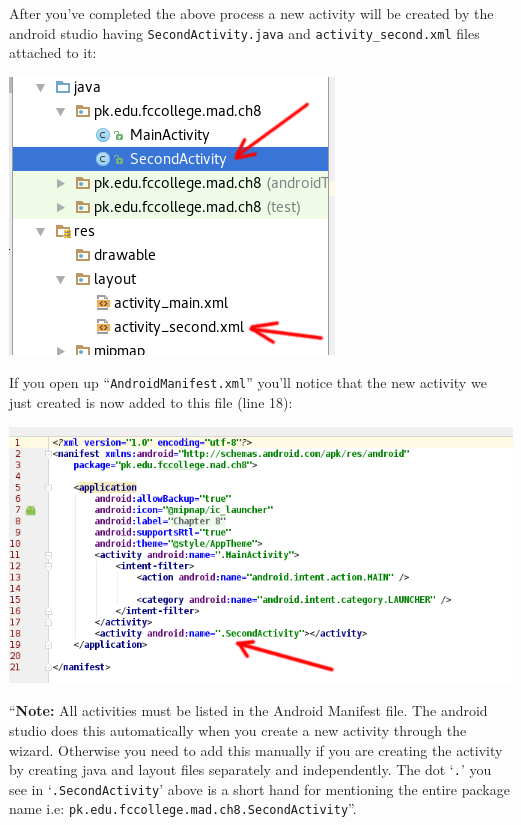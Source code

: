 After you've completed the above process a new activity will be created by the android studio having \texttt{SecondActivity.java} and \texttt{activity\_second.xml} files attached to it:

\begin{center}
	\includegraphics[scale=0.4]{chapters/ch08/images/4}
\end{center}

If you open up ``\texttt{AndroidManifest.xml}'' you'll notice that the new activity we just created is now added to this file (line 18):

\begin{center}
	\includegraphics[scale=0.4]{chapters/ch08/images/5}
\end{center}

``\textbf{Note:} All activities must be listed in the Android Manifest file. The android studio does this automatically when you create a new activity through the wizard. Otherwise you need to add this manually if you are creating the activity by creating java and layout files separately and independently. The dot `\texttt{.}' you see in `\texttt{.SecondActivity}' above is a short hand for mentioning the entire package name i.e: \texttt{pk.edu.fccollege.mad.ch8.SecondActivity}''. \\

